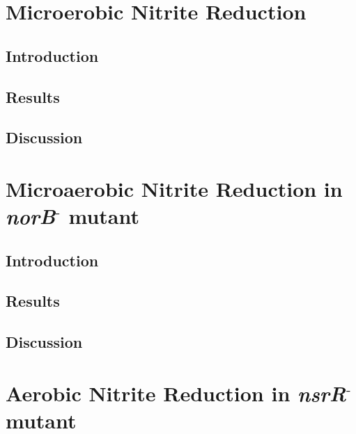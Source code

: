 
\section{Microerobic Nitrite Reduction}
\subsection{Introduction}
\subsection{Results}
\subsection{Discussion}
\section{Microaerobic Nitrite Reduction in \textit{norB$^\textrm{-}$} mutant}
\subsection{Introduction}
\subsection{Results}
\subsection{Discussion}
\section{Aerobic Nitrite Reduction in \textit{nsrR$^\textrm{-}$} mutant}
